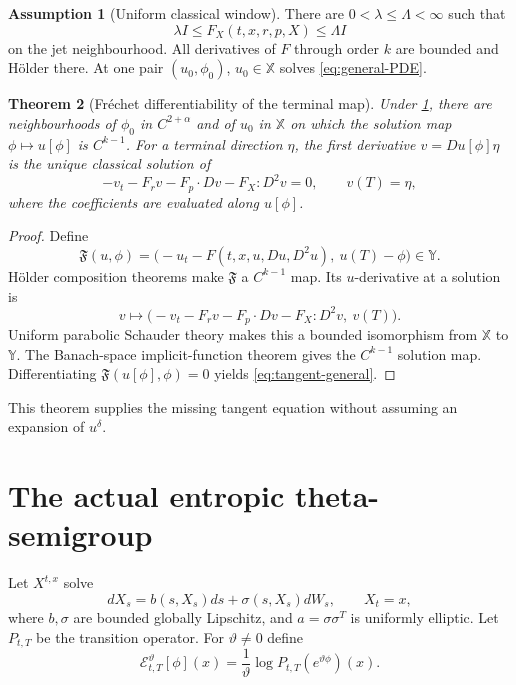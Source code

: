 \documentclass[11pt,reqno]{amsart}
\newtheorem{theorem}{Theorem}[section]
\theoremstyle{definition}
\newtheorem{assumption}[theorem]{Assumption}
\theoremstyle{remark}
\newcommand{\cE}{\mathcal E}
\begin{document}
\begin{assumption}[Uniform classical window]\label{ass:classical-window}
There are $0<\lambda\le\Lambda<\infty$ such that
\[
 \lambda I\le F_X(t,x,r,p,X)\le\Lambda I
\]
on the jet neighbourhood.  All derivatives of $F$ through order $k$ are
bounded and H\"older there.  At one pair $(u_0,\phi_0)$,
$u_0\in\mathbb X$ solves \eqref{eq:general-PDE}.
\end{assumption}

\begin{theorem}[Fr\'echet differentiability of the terminal map]\label{thm:IFT}
Under \cref{ass:classical-window}, there are neighbourhoods of $\phi_0$ in
$C^{2+\alpha}$ and of $u_0$ in $\mathbb X$ on which the solution map
$\phi\mapsto u[\phi]$ is $C^{k-1}$.  For a terminal direction $\eta$, the first
derivative $v=Du[\phi]\eta$ is the unique classical solution of
\begin{equation}\label{eq:tangent-general}
 -v_t-F_rv-F_p\cdot Dv-F_X:D^2v=0,
 \qquad v(T)=\eta,
\end{equation}
where the coefficients are evaluated along $u[\phi]$.
\end{theorem}

\begin{proof}
Define
\[
 \mathfrak F(u,\phi)=
 \bigl(-u_t-F(t,x,u,Du,D^2u),\ u(T)-\phi\bigr)
 \in\mathbb Y.
\]
H\"older composition theorems make $\mathfrak F$ a $C^{k-1}$ map.  Its
$u$-derivative at a solution is
\[
 v\longmapsto
 \bigl(-v_t-F_rv-F_p\cdot Dv-F_X:D^2v,\ v(T)\bigr).
\]
Uniform parabolic Schauder theory makes this a bounded isomorphism from
$\mathbb X$ to $\mathbb Y$.  The Banach-space implicit-function theorem gives
the $C^{k-1}$ solution map.  Differentiating
$\mathfrak F(u[\phi],\phi)=0$ yields \eqref{eq:tangent-general}.
\end{proof}

This theorem supplies the missing tangent equation without assuming an
expansion of $u^{\delta}$.

\section{The actual entropic theta-semigroup}\label{sec:entropic}

Let $X^{t,x}$ solve
\begin{equation}\label{eq:forward}
 dX_s=b(s,X_s)ds+\sigma(s,X_s)dW_s,
 \qquad X_t=x,
\end{equation}
where $b,\sigma$ are bounded globally Lipschitz, and
$a=\sigma\sigma^T$ is uniformly elliptic.  Let $P_{t,T}$ be the transition
operator.  For $\vartheta\ne0$ define
\begin{equation}\label{eq:theta-map}
 \cE_{t,T}^{\vartheta}[\phi](x)
 =\frac1\vartheta\log P_{t,T}(e^{\vartheta\phi})(x).
\end{equation}
\end{document}
